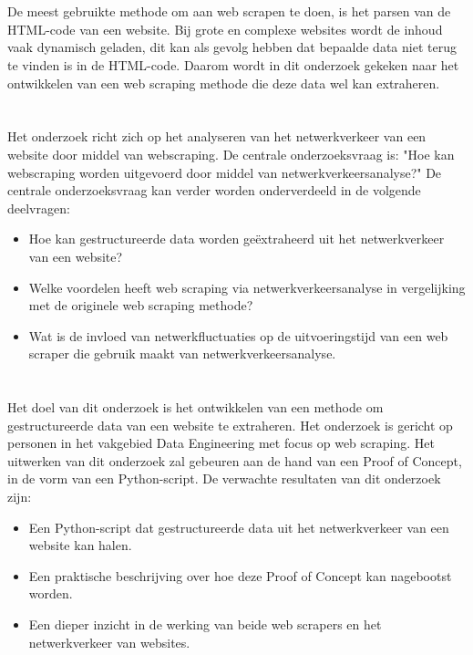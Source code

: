 \section{}%
\label{sec:probleemstelling}
De meest gebruikte methode om aan web scrapen te doen, is het parsen van de HTML-code van een website. Bij grote en complexe websites wordt de inhoud vaak dynamisch geladen, dit kan als gevolg hebben dat bepaalde data niet terug te vinden is in de HTML-code. Daarom wordt in dit onderzoek gekeken naar het ontwikkelen van een web scraping methode die deze data wel kan extraheren.

\section{}%
\label{sec:onderzoeksvraag}
Het onderzoek richt zich op het analyseren van het netwerkverkeer van een website door middel van webscraping. De centrale onderzoeksvraag is: "Hoe kan webscraping worden uitgevoerd door middel van netwerkverkeersanalyse?" De centrale onderzoeksvraag kan verder worden onderverdeeld in de volgende deelvragen:
\begin{itemize}
    \item Hoe kan gestructureerde data worden geëxtraheerd uit het netwerkverkeer van een website?

    \item Welke voordelen heeft web scraping via netwerkverkeersanalyse in vergelijking met de originele web scraping methode?

    \item Wat is de invloed van netwerkfluctuaties op de uitvoeringstijd van een web scraper die gebruik maakt van netwerkverkeersanalyse.
\end{itemize}



\section{}%
\label{sec:onderzoeksdoelstelling}
Het doel van dit onderzoek is het ontwikkelen van een methode om gestructureerde data van een website te extraheren. Het onderzoek is gericht op personen in het vakgebied Data Engineering met focus op web scraping. Het uitwerken van dit onderzoek zal gebeuren aan de hand van een Proof of Concept, in de vorm van een Python-script. De verwachte resultaten van dit onderzoek zijn:
\begin{itemize}
    \item Een Python-script dat gestructureerde data uit het netwerkverkeer van een website kan halen.

    \item Een praktische beschrijving over hoe deze Proof of Concept kan nagebootst worden.

    \item Een dieper inzicht in de werking van beide web scrapers en het netwerkverkeer van websites.
\end{itemize}

